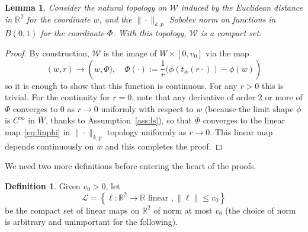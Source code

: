 \documentclass[10pt]{amsart}
\newtheorem{lemm}[theo]{Lemma}\newtheorem{prop}[theo]{Proposition}\newtheorem{coro}[theo]{Corollary}\newtheorem{conj}[theo]{Conjecture}
\theoremstyle{definition}\newtheorem{defi}[theo]{Definition}\newtheorem{rema}[theo]{Remark}\newtheorem{exam}[theo]{Example}\newtheorem{exem}[theo]{Example}\newtheorem{nota}[theo]{Notation}
\newcommand{\R}{\mathbb{R}}
\newcommand{\clL}{\mathcal{L}}
\newcommand{\clW}{\mathcal{W}}
\newcommand{\norm}[1]{\lVert #1 \rVert}
\begin{document}
\begin{lemm}\label{lem:compact}
Consider the natural topology on $\clW$ induced by the Euclidean distance in $\R^2$ for the coordinate $w$, and the $\|\cdot\|_{k,p}$ Sobolev norm on functions in $B(0,1)$ for the coordinate $\Phi$. With this topology, $\clW$ is a compact set.
\end{lemm}


\begin{proof}
By construction, $\clW$ is the image of $\overline{W}\times [0,v_0]$ via the map
\begin{equation}
(w,r) \to \left(w,\Phi),\quad \Phi(\cdot):=\frac{1}{r}(\phi(t_w(r\cdot)) - \phi(w)\right)
\end{equation}
so it is enough to show that this function is continuous. For any $r > 0$ this is trivial. For the continuity for $r=0$, note that any derivative of order 2 or more of $ \Phi$ converges to $0$ as $r \to 0$ uniformly with respect to $w$ (because the limit shape $\phi$ is $C^\infty$ in $\overline W$, thanks to Assumption~\ref{ass:ls}), so that $\Phi$ converges to the linear map~\eqref{eq:linphi} in $\|\cdot\|_{k,p}$ topology uniformly as $r \to 0$. This linear map depends continuously on $w$ and this completes the proof.
\end{proof}

We need two more definitions before entering the heart of the proofs.

\begin{defi}
Given $v_0>0$, let
\begin{equation}
\clL = \left\{ \ell : \R^2 \to \R \text{ linear }, \norm{\ell} \leq v_0\right\}
\end{equation}
be the compact set of linear maps on $\R^2$ of norm at most $v_0$ (the choice of norm is arbitrary and unimportant for the following).
\end{defi}
\end{document}
